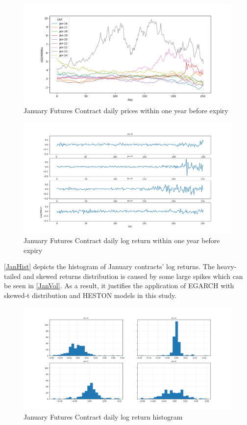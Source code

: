 \documentclass[12pt,a4paper]{article}
\newcommand\colorAutoref[1]{{\hypersetup{linkcolor=black}\autoref{#1}}}
\numberwithin{equation}{section}
\begin{document}
\begin{figure}[h!] 
\includegraphics[scale=1,width=1\linewidth,height=0.4\textheight]{Jan_price.png}
\caption{January Futures Contract daily prices within one year before expiry}
\label{JanPrice}
\end{figure}
\begin{figure}[h!] 
\includegraphics[scale=1,width=1\linewidth,height=0.4\textheight]{Jan_vol.png}
\caption{January Futures Contract daily log return within one year before expiry}
\label{JanVol}
\end{figure}

\colorAutoref{JanHist} depicts the histogram of January contracts' log returns. The heavy-tailed and skewed returns distribution is caused by some large spikes which can be seen in \colorAutoref{JanVol}. As a result, it justifies the application of EGARCH with skewed-t distribution and HESTON models in this study.

\begin{figure}[h!] 
\includegraphics[scale=1,width=1\linewidth,height=0.4\textheight]{Jan_returnshist.png}
\caption{January Futures Contract daily log return histogram}
\label{JanHist}
\end{figure}
\end{document}
